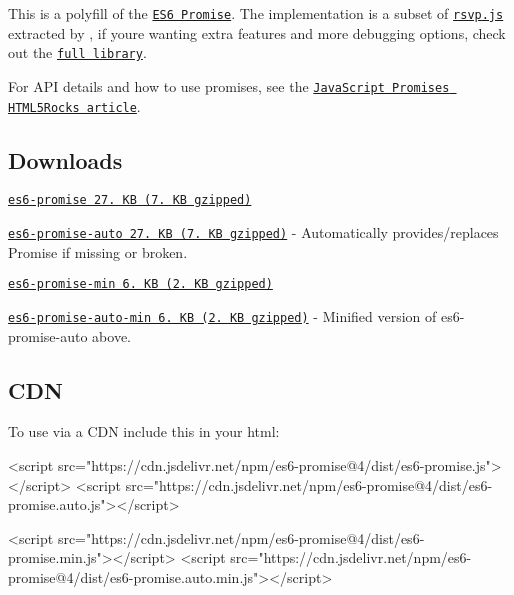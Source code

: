 This is a polyfill of the \href{http://www.ecma-international.org/ecma-262/6.0/#sec-promise-constructor}{\tt E\+S6 Promise}. The implementation is a subset of \href{https://github.com/tildeio/rsvp.js}{\tt rsvp.\+js} extracted by , if you\textquotesingle{}re wanting extra features and more debugging options, check out the \href{https://github.com/tildeio/rsvp.js}{\tt full library}.

For A\+PI details and how to use promises, see the \href{http://www.html5rocks.com/en/tutorials/es6/promises/}{\tt Java\+Script Promises H\+T\+M\+L5\+Rocks article}.

\subsection*{Downloads}


\begin{DoxyItemize}
\item \href{https://cdn.jsdelivr.net/npm/es6-promise/dist/es6-promise.js}{\tt es6-\/promise 27. KB (7. KB gzipped)}
\item \href{https://cdn.jsdelivr.net/npm/es6-promise/dist/es6-promise.auto.js}{\tt es6-\/promise-\/auto 27. KB (7. KB gzipped)} -\/ Automatically provides/replaces {\ttfamily Promise} if missing or broken.
\item \href{https://cdn.jsdelivr.net/npm/es6-promise/dist/es6-promise.min.js}{\tt es6-\/promise-\/min 6. KB (2. KB gzipped)}
\item \href{https://cdn.jsdelivr.net/npm/es6-promise/dist/es6-promise.auto.min.js}{\tt es6-\/promise-\/auto-\/min 6. KB (2. KB gzipped)} -\/ Minified version of {\ttfamily es6-\/promise-\/auto} above.
\end{DoxyItemize}

\subsection*{C\+DN}

To use via a C\+DN include this in your html\+:


\begin{DoxyCode}
<script src="https://cdn.jsdelivr.net/npm/es6-promise@4/dist/es6-promise.js"></script>
<script src="https://cdn.jsdelivr.net/npm/es6-promise@4/dist/es6-promise.auto.js"></script> 


<script src="https://cdn.jsdelivr.net/npm/es6-promise@4/dist/es6-promise.min.js"></script>
<script src="https://cdn.jsdelivr.net/npm/es6-promise@4/dist/es6-promise.auto.min.js"></script> 
\end{DoxyCode}


